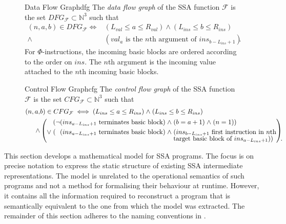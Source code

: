 \begin{figure}[p]
\begin{definition}{Data Flow Graph}{dfg}
    The {\em data flow graph} of the SSA function $\mathcal F$ is the set
    $DFG_{\mathcal F}\subset \mathbb N^3$ such that
    \begin{align*}
        (n,a,b)\in DFG_{\mathcal F}\iff{}&\left(L_{val}\leq a\leq R_{val}\right)
            \mathrel{\land}\left(L_{ins}\leq b\leq R_{ins}\right)\\
            \mathrel{\land}{}&(val_a\text{ is the $n$th argument of }ins_{b-L_{ins}+1}).
    \end{align*}
    For $\Phi$-instructions, the incoming basic blocks are ordered according to
    the order on $ins$.
    The $n$th argument is the incoming value attached to the $n$th incoming
    basic blocks.
\end{definition}
\begin{definition}{Control Flow Graph}{cfg}
    The {\em control flow graph} of the SSA function $\mathcal F$ is the set
    $CFG_{\mathcal F}\subset \mathbb N^3$ such that
    \begin{align*}
        (n,a,&{}b)\in CFG_{\mathcal F}\iff\left(L_{ins}\leq a\leq R_{ins}\right)\mathrel\land\left(L_{ins}\leq b\leq R_{ins}\right)\\
               \mathrel{\land}&\left(\begin{aligned}[c]
                                    (\neg (ins_{a-L_{ins}+1}\text{ terminates basic block})\mathrel\land{}&(b=a+1)\mathrel\land(n=1))\\
                      \mathrel{\lor}(\phantom{\neg}(ins_{a-L_{ins}+1}\text{ terminates basic block})\mathrel\land{}&(ins_{b-L_{ins}+1}\text{ first instruction in}\text{ $n$th}\\[-0.5em]
                                                   &\text{target basic block of }ins_{a-L_{ins}+1}))\hspace{4mm}.\hspace{-4mm}
        \end{aligned}\right)
    \end{align*}
\end{definition}
\end{figure}

    This section develops a mathematical model for SSA programs.
    The focus is on precise notation to express the static structure of existing
    SSA intermediate representations.
    The model is unrelated to the operational semantics of such programs and not
    a method for formalising their behaviour at runtime.
    However, it contains all the information required to reconstruct a program
    that is semantically equivalent to the one from which the model was
    extracted.
    The remainder of this section adheres to the naming conventions in
    .

